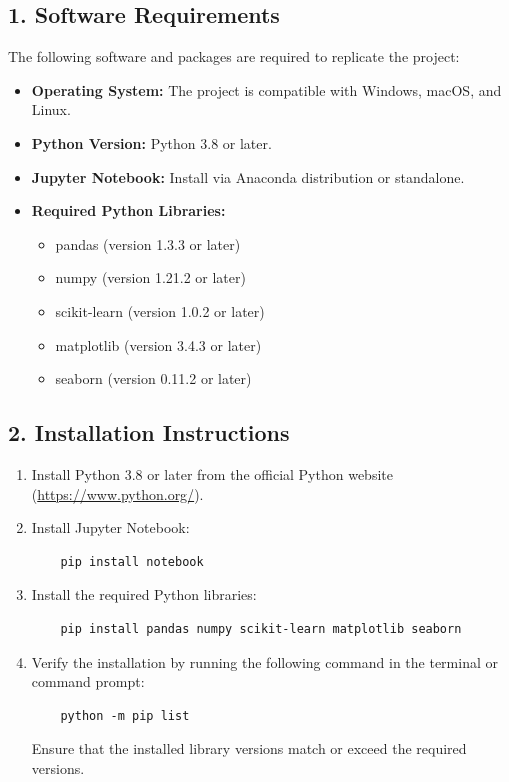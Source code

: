 \documentclass[10pt,twocolumn]{article}
\begin{document}
\subsection*{1. Software Requirements}
The following software and packages are required to replicate the project:
\begin{itemize}
    \item \textbf{Operating System:} The project is compatible with Windows, macOS, and Linux.
    \item \textbf{Python Version:} Python 3.8 or later.
    \item \textbf{Jupyter Notebook:} Install via Anaconda distribution or standalone.
    \item \textbf{Required Python Libraries:}
    \begin{itemize}
        \item pandas (version 1.3.3 or later)
        \item numpy (version 1.21.2 or later)
        \item scikit-learn (version 1.0.2 or later)
        \item matplotlib (version 3.4.3 or later)
        \item seaborn (version 0.11.2 or later)
    \end{itemize}
\end{itemize}

\subsection*{2. Installation Instructions}
\begin{enumerate}
    \item Install Python 3.8 or later from the official Python website (\url{https://www.python.org/}).
    \item Install Jupyter Notebook:
    \begin{verbatim}
    pip install notebook
    \end{verbatim}
    \item Install the required Python libraries:
    \begin{verbatim}
    pip install pandas numpy scikit-learn matplotlib seaborn
    \end{verbatim}
    \item Verify the installation by running the following command in the terminal or command prompt:
    \begin{verbatim}
    python -m pip list
    \end{verbatim}
    Ensure that the installed library versions match or exceed the required versions.
\end{enumerate}
\end{document}
